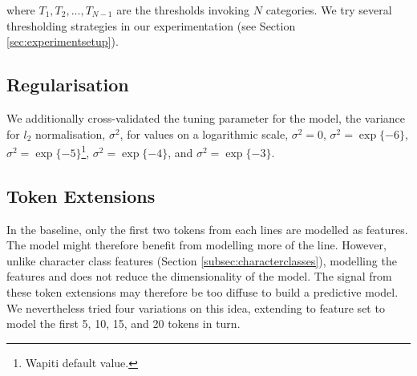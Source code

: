 where $T_1, T_2, ..., T_{N-1}$ are the thresholds invoking $N$ categories. We try several thresholding strategies in our experimentation (see Section \ref{sec:experimentsetup}).

\subsection{Regularisation}

We additionally cross-validated the tuning parameter for the model, the variance for $l_2$ normalisation, $\sigma^2$, for values on a logarithmic scale, $\sigma^2 = 0$, $\sigma^2 = \exp\{-6\}$, $\sigma^2 = \exp\{-5\}$\footnote{Wapiti default value.}, $\sigma^2 = \exp\{-4\}$, and $\sigma^2 = \exp\{-3\}$.

\subsection{Token Extensions}

In the baseline, only the first two tokens from each lines are modelled as features. The model might therefore benefit from modelling more of the line. However, unlike character class features (Section \ref{subsec:characterclasses}), modelling the features and does not reduce the dimensionality of the model. The signal from these token extensions may therefore be too diffuse to build a predictive model. We nevertheless tried four variations on this idea, extending to feature set to model the first 5, 10, 15, and 20 tokens in turn.

